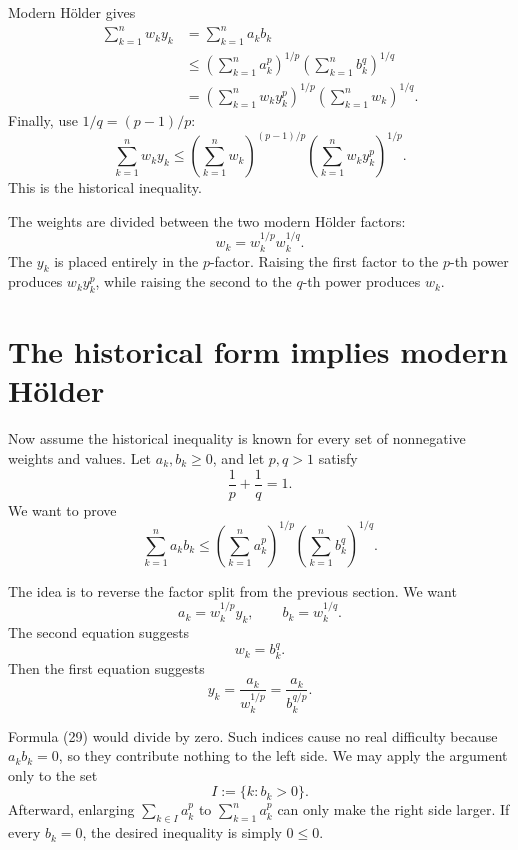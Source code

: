 \documentclass[11pt]{article}
\begin{document}
\begin{solutionBox}
Modern H\"older gives
\[
\begin{aligned}
 \sum_{k=1}^{n}w_ky_k
 &=\sum_{k=1}^{n}a_kb_k\\
 &\leq
 \left(\sum_{k=1}^{n}a_k^p\right)^{1/p}
 \left(\sum_{k=1}^{n}b_k^q\right)^{1/q}\\
 &=
 \left(\sum_{k=1}^{n}w_ky_k^p\right)^{1/p}
 \left(\sum_{k=1}^{n}w_k\right)^{1/q}.
\end{aligned}
 \tag{24}
\]
Finally, use \(1/q=(p-1)/p\):
\[
 \sum_{k=1}^{n}w_ky_k
 \leq
 \left(\sum_{k=1}^{n}w_k\right)^{(p-1)/p}
 \left(\sum_{k=1}^{n}w_ky_k^p\right)^{1/p}.
\]
This is the historical inequality.
\end{solutionBox}

\begin{ideaBox}
The weights are divided between the two modern H\"older factors:
\[
 w_k=w_k^{1/p}w_k^{1/q}.
\]
The \(y_k\) is placed entirely in the \(p\)-factor. Raising the first factor to the \(p\)-th power produces \(w_ky_k^p\), while raising the second to the \(q\)-th power produces \(w_k\).
\end{ideaBox}

\section{The historical form implies modern H\"older}

Now assume the historical inequality is known for every set of nonnegative weights and values. Let \(a_k,b_k\geq0\), and let \(p,q>1\) satisfy
\[
 \frac1p+\frac1q=1.
 \tag{25}
\]
We want to prove
\[
 \sum_{k=1}^{n}a_kb_k
 \leq
 \left(\sum_{k=1}^{n}a_k^p\right)^{1/p}
 \left(\sum_{k=1}^{n}b_k^q\right)^{1/q}.
 \tag{26}
\]

The idea is to reverse the factor split from the previous section. We want
\[
 a_k=w_k^{1/p}y_k,
 \qquad
 b_k=w_k^{1/q}.
 \tag{27}
\]
The second equation suggests
\[
 w_k=b_k^q.
 \tag{28}
\]
Then the first equation suggests
\[
 y_k=\frac{a_k}{w_k^{1/p}}
 =\frac{a_k}{b_k^{q/p}}.
 \tag{29}
\]

\begin{warningBox}[What about an index with \(b_k=0\)?]
Formula (29) would divide by zero. Such indices cause no real difficulty because \(a_kb_k=0\), so they contribute nothing to the left side. We may apply the argument only to the set
\[
 I:=\{k:b_k>0\}.
\]
Afterward, enlarging \(\sum_{k\in I}a_k^p\) to \(\sum_{k=1}^{n}a_k^p\) can only make the right side larger. If every \(b_k=0\), the desired inequality is simply \(0\leq0\).
\end{warningBox}
\end{document}
